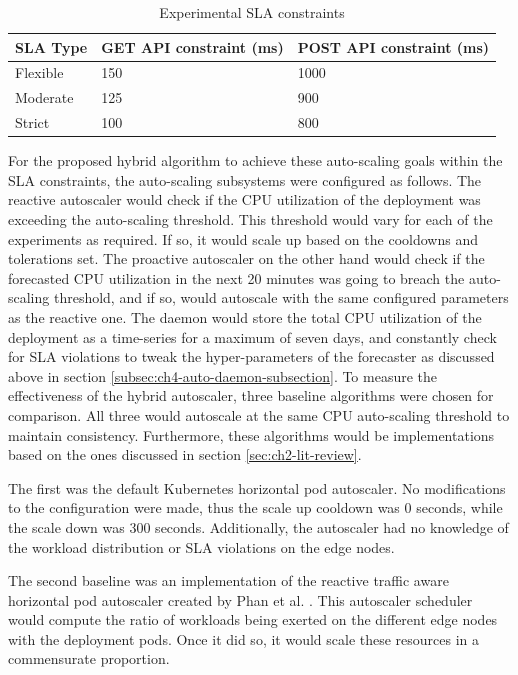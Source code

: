 \begin{table}
    \caption{Experimental SLA constraints}\label{tab:experiment-sla-values}
    \centering
    \begin{tabular}{|l|l|l|}
        \hline
        SLA Type & GET API constraint (ms) & POST API constraint (ms)\\
        \hline
        Flexible    & 150   & 1000\\
        Moderate    & 125   & 900\\
        Strict      & 100   & 800\\
        \hline
    \end{tabular}
\end{table}

For the proposed hybrid algorithm to achieve these auto-scaling goals within the SLA constraints, the auto-scaling subsystems were configured as follows. The reactive autoscaler would check if the CPU utilization of the deployment was exceeding the auto-scaling threshold. This threshold would vary for each of the experiments as required. If so, it would scale up based on the cooldowns and tolerations set. The proactive autoscaler on the other hand would check if the forecasted CPU utilization in the next 20 minutes was going to breach the auto-scaling threshold, and if so, would autoscale with the same configured parameters as the reactive one. The daemon would store the total CPU utilization of the deployment as a time-series for a maximum of seven days, and constantly check for SLA violations to tweak the hyper-parameters of the forecaster as discussed above in section \ref{subsec:ch4-auto-daemon-subsection}. To measure the effectiveness of the hybrid autoscaler, three baseline algorithms were chosen for comparison. All three would autoscale at the same CPU auto-scaling threshold to maintain consistency. Furthermore, these algorithms would be implementations based on the ones discussed in section \ref{sec:ch2-lit-review}.\par

The first was the default Kubernetes horizontal pod autoscaler. No modifications to the configuration were made, thus the scale up cooldown was 0 seconds, while the scale down was 300 seconds. Additionally, the autoscaler had no knowledge of the workload distribution or SLA violations on the edge nodes.\par

The second baseline was an implementation of the reactive traffic aware horizontal pod autoscaler created by Phan et al. \cite{phan2022traffic}. This autoscaler scheduler would compute the ratio of workloads being exerted on the different edge nodes with the deployment pods. Once it did so, it would scale these resources in a commensurate proportion.\par

